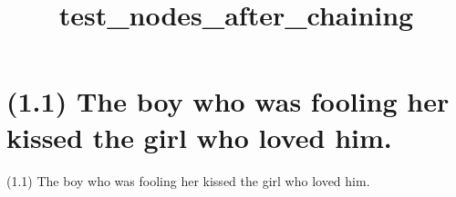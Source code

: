 \documentclass{article}
\begin{document}
%
%

\title{\textbf{test\_nodes\_after\_chaining}}
\maketitle

\clearpage

%
%

\section*{(1.1) The boy who was fooling her kissed the girl who loved him.}

\bigbreak
\begin{enumerate*}
\item[(1.1)] The boy who was fooling her kissed the girl who loved him.
\end{enumerate*}
\bigbreak
\end{document}
